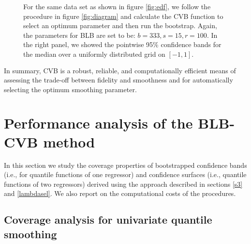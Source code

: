 \documentclass{statsoc}
\begin{document}
\begin{figure}[H]
\centering   
\caption{For the same data set as shown in figure \ref{fig:edf}, we follow the procedure in figure \ref{fig:diagram} and calculate the CVB function to select an optimum parameter and then run the bootstrap. Again, the parameters for BLB are set to be: $b=333, s=15, r=100$. In the right panel, we showed the pointwise 95\% confidence bands for the median over a uniformly distributed grid on $[-1,1]$.}
\label{fig:blb5000}
\end{figure}

In summary, CVB is a robust, reliable, and computationally efficient means of assessing the trade-off between fidelity and smoothness and for automatically selecting the optimum smoothing parameter. 

\section{Performance analysis of the BLB-CVB method}\label{s5}

In this section we study the coverage properties of bootstrapped confidence bands (i.e., for quantile functions of one regressor) and confidence surfaces (i.e., quantile functions of two regressors) derived using the approach described in sections \ref{s3} and \ref{lambdasel}. We also report on the computational costs of the procedures.

\subsection{Coverage analysis for univariate quantile smoothing}
\end{document}
